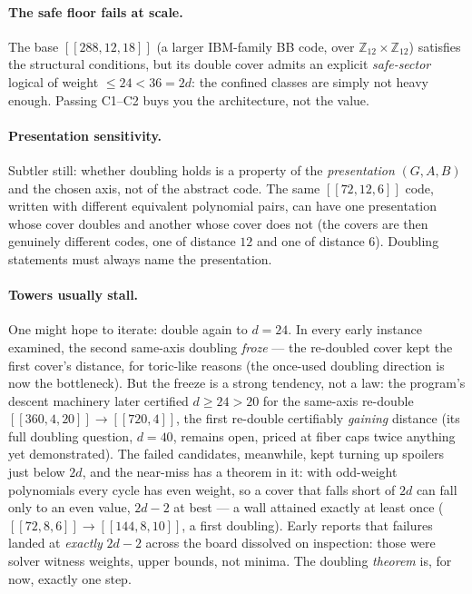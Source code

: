 \documentclass[11pt]{article}
\theoremstyle{plain}
\theoremstyle{definition}
\theoremstyle{remark}
\newcommand{\Z}{\mathbb{Z}}
\begin{document}
\paragraph{The safe floor fails at scale.}
The base $[[288,12,18]]$ (a larger IBM-family BB code, over
$\Z_{12}\times\Z_{12}$) satisfies the structural conditions, but its double
cover admits an explicit \emph{safe-sector} logical of weight $\leq 24 < 36 =
2d$: the confined classes are simply not heavy enough. Passing C1--C2 buys
you the architecture, not the value.

\paragraph{Presentation sensitivity.}
Subtler still: whether doubling holds is a property of the \emph{presentation}
$(G, A, B)$ and the chosen axis, not of the abstract code. The same
$[[72,12,6]]$ code, written with different equivalent polynomial pairs, can
have one presentation whose cover doubles and another whose cover does not
(the covers are then genuinely different codes, one of distance $12$ and one
of distance $6$). Doubling statements must always name the presentation.

\paragraph{Towers usually stall.}
One might hope to iterate: double again to $d = 24$. In every early instance
examined, the second same-axis doubling \emph{froze} --- the re-doubled
cover kept the first cover's distance, for toric-like reasons (the once-used
doubling direction is now the bottleneck). But the freeze is a strong
tendency, not a law: the program's descent machinery later certified $d \geq
24 > 20$ for the same-axis re-double $[[360,4,20]] \to [[720,4]]$, the first
re-double certifiably \emph{gaining} distance (its full doubling question,
$d = 40$, remains open, priced at fiber caps twice anything yet
demonstrated). The failed candidates, meanwhile, kept turning up spoilers
just below $2d$, and the near-miss has a theorem in it: with odd-weight
polynomials every cycle has even weight, so a cover that falls short of $2d$
can fall only to an even value, $2d - 2$ at best --- a wall attained exactly
at least once ($[[72,8,6]] \to [[144,8,10]]$, a first doubling). Early
reports that failures landed at \emph{exactly} $2d - 2$ across the board
dissolved on inspection: those were solver witness weights, upper bounds,
not minima. The doubling \emph{theorem} is, for now, exactly one step.
\end{document}
